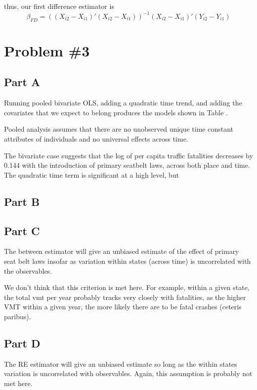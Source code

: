 \documentclass[letterpaper, 12pt]{article}
\begin{document}
thus, our first difference estimator is
\begin{equation}
\widehat{\beta_{FD}}=((X_{i2}-X_{i1})'(X_{i2}-X_{i1}))^{-1} (X_{i2}-X_{i1})'(Y_{i2}-Y_{i1})
\end{equation}

\section{Problem \#3}
\subsection{Part A}
Running pooled bivariate OLS, adding a quadratic time trend, and adding the covariates that we expect to belong produces the models shown in Table .


Pooled analysis assumes that there are no unobserved unique time constant attributes of individuals and no universal effects across time.

The bivariate case suggests that the log of per capita traffic fatalities decreases by 0.144 with the introduction of primary seatbelt laws, across both place and time.
The quadratic time term is significant at a high level, but 

\subsection{Part B}


\subsection{Part C}
The between estimator will give an unbiased estimate of the effect of primary seat belt laws insofar as variation within states (across time) is uncorrelated with the observables.


We don't think that this criterion is met here. For example, within a given state, the total vmt per year probably tracks very closely with fatalities, as the higher VMT within a given year, the more likely there are to be fatal crashes (ceteris paribus).


\subsection{Part D}
The RE estimator will give an unbiased estimate so long as the within states variation is uncorrelated with observables. Again, this assumption is probably not met here.

\end{document}
